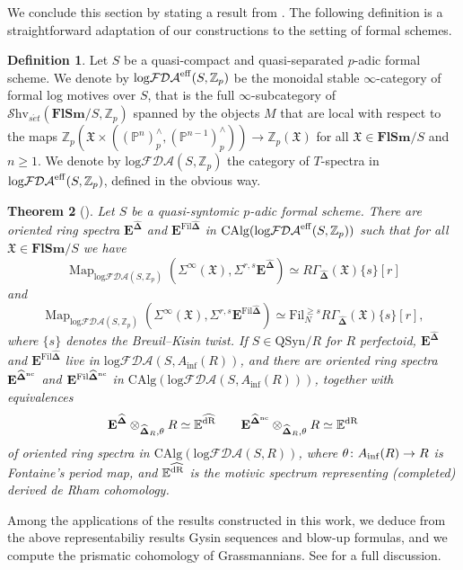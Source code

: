 \documentclass[11pt, a4paper]{amsart}
\newtheorem{thm}{Theorem}[subsection]
\theoremstyle{definition}
\newtheorem{df}[thm]{Definition}
\numberwithin{equation}{subsection}
\newcommand{\Z}{\mathbb{Z}}
\renewcommand{\P}{\mathbb{P}}
\newcommand{\E}{\mathbb{E}}
\newcommand{\et}{{\acute{e}t}}
\newcommand{\eff}{{\rm eff}}
\newcommand{\infShv}{\mathcal{S}\mathrm{hv}}
\newcommand{\Map}{\operatorname{Map}}
\newcommand{\CAlg}{\mathrm{CAlg}}
\newcommand{\inflogFDA}{\mathrm{log}\mathcal{FDA}}
\begin{document}
We conclude this section by stating a result from \cite{BLMP}. The following definition is a straightforward adaptation of our constructions to the setting of formal schemes.
\begin{df}
Let $S$ be a quasi-compact and quasi-separated $p$-adic formal scheme. 
We denote by $\inflogFDA^\eff(S,\Z_p)$ be the monoidal stable $\infty$-category of formal log motives over $S$, that is the full $\infty$-subcategory of $\infShv_{s\et}(\mathbf{FlSm}/S, \Z_p)$ spanned by the objects $M$ that are local with respect to the maps $\Z_p(\mathfrak{X}\times ((\P^n)^\wedge_p, (\P^{n-1})^\wedge_p)) \to \Z_p(\mathfrak{X})$ for all $\mathfrak{X}\in \mathbf{FlSm}/S$ and $n\geq 1$. We denote by $\inflogFDA(S,\Z_p)$ the category of $T$-spectra in  $\inflogFDA^\eff(S,\Z_p)$, defined in the obvious way.
\end{df}
\begin{thm}[{\cite[Theorem 3.5]{BLMP}}] 
    Let $S$ be a quasi-syntomic $p$-adic formal scheme. There are oriented ring spectra $\mathbf{E}^{\widehat{\mathbf{\Delta}}}$ and  $\mathbf{E}^{\mathrm{Fil}\widehat{\mathbf{\Delta}}}$ in $\CAlg(\inflogFDA^\eff(S,\Z_p))$ such that for all $\mathfrak{X}\in \mathbf{FlSm}/S$ we have
    \[
\Map_{\inflogFDA(S,\Z_p)}(\Sigma^{\infty}(\mathfrak{X}),\Sigma^{r,s}\mathbf{E}^{\widehat{\mathbf{\Delta}}}) \simeq R\Gamma_{\widehat{\mathbf{\Delta}}}(\mathfrak{X})\{s\}[r]
\]
and
\[
\Map_{\inflogFDA(S,\Z_p)}(\Sigma^{\infty}(\mathfrak{X}),\Sigma^{r,s}\mathbf{E}^{\mathrm{Fil}\widehat{\mathbf{\Delta}}}) \simeq \mathrm{Fil}_N^{\geq s}R\Gamma_{\widehat{\mathbf{\Delta}}}(\mathfrak{X})\{s\}[r],
\]
where $\{s\}$ denotes the Breuil--Kisin twist. 
If $S\in \mathrm{QSyn}/R$ for $R$ perfectoid, $\mathbf{E}^{\widehat{\mathbf{\Delta}}}$ and $\mathbf{E}^{\mathrm{Fil}\widehat{\mathbf{\Delta}}}$ live in $\inflogFDA(S,A_{\inf}(R))$, and there are oriented ring spectra $\mathbf{E}^{\widehat{\mathbf{\Delta}}^{\rm nc}}$ and $\mathbf{E}^{\mathrm{Fil}\widehat{\mathbf{\Delta}}^{\rm nc}}$ in $\CAlg(\inflogFDA(S,A_{\inf}(R)))$, together with equivalences 
\begin{equation}\label{eq:prism-deRham}
\mathbf{E}^{\widehat{\mathbf{\Delta}}}\otimes_{\widehat{\mathbf{\Delta}}_R,\theta}R \simeq \E^{\rm \widehat{dR}}\qquad \mathbf{E}^{\widehat{\mathbf{\Delta}}^{\rm nc}}\otimes_{\widehat{\mathbf{\Delta}}_R,\theta}R \simeq \E^{\rm dR}        
\end{equation}
of oriented ring spectra in $\CAlg(\inflogFDA(S,R))$, where $\theta \colon A_{\rm inf}(R) \to R$ is Fontaine's period map, and $\E^{\rm \widehat{dR}}$ is the motivic spectrum representing (completed) derived de Rham cohomology.
\end{thm}
Among the applications of the results constructed in this work, we deduce from the above representabiliy results Gysin sequences and blow-up formulas,
and we compute the prismatic cohomology of Grassmannians. See \cite{BLMP} for a full discussion.
\end{document}
